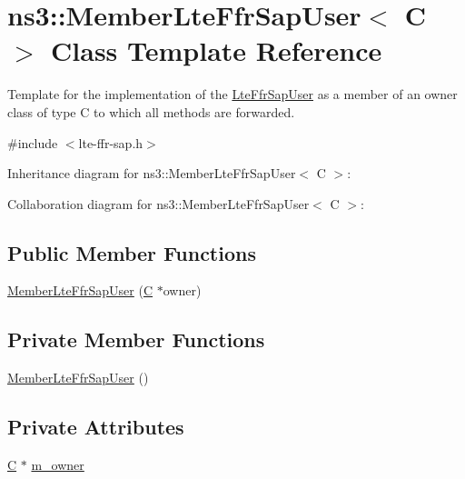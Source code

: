\hypertarget{classns3_1_1MemberLteFfrSapUser}{}\section{ns3\+:\+:Member\+Lte\+Ffr\+Sap\+User$<$ C $>$ Class Template Reference}
\label{classns3_1_1MemberLteFfrSapUser}


Template for the implementation of the \hyperlink{classns3_1_1LteFfrSapUser}{Lte\+Ffr\+Sap\+User} as a member of an owner class of type C to which all methods are forwarded.  




{\ttfamily \#include $<$lte-\/ffr-\/sap.\+h$>$}



Inheritance diagram for ns3\+:\+:Member\+Lte\+Ffr\+Sap\+User$<$ C $>$\+:


Collaboration diagram for ns3\+:\+:Member\+Lte\+Ffr\+Sap\+User$<$ C $>$\+:
\subsection*{Public Member Functions}
\begin{DoxyCompactItemize}
\item 
\hyperlink{classns3_1_1MemberLteFfrSapUser_a3703ff1f9e5bdb14174b8d0d19654092}{Member\+Lte\+Ffr\+Sap\+User} (\hyperlink{loss__COST231__small__cities__urban_8m_aaa53ca0b650dfd85c4f59fa156f7a2cc}{C} $\ast$owner)
\end{DoxyCompactItemize}
\subsection*{Private Member Functions}
\begin{DoxyCompactItemize}
\item 
\hyperlink{classns3_1_1MemberLteFfrSapUser_a2def795e7952886b713b15391d8f0189}{Member\+Lte\+Ffr\+Sap\+User} ()
\end{DoxyCompactItemize}
\subsection*{Private Attributes}
\begin{DoxyCompactItemize}
\item 
\hyperlink{loss__COST231__small__cities__urban_8m_aaa53ca0b650dfd85c4f59fa156f7a2cc}{C} $\ast$ \hyperlink{classns3_1_1MemberLteFfrSapUser_ab45f512f2011a02858715339eb57070f}{m\+\_\+owner}
\end{DoxyCompactItemize}


